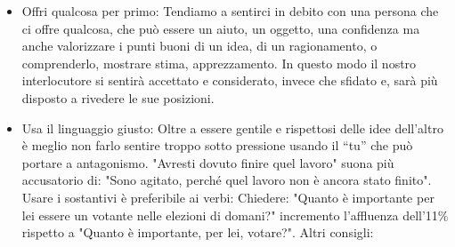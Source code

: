 \documentclass[12pt]{book} %
\begin{document}
\begin{itemize}
\item Offri qualcosa per primo: Tendiamo a sentirci in debito con una persona che ci offre qualcosa, che può essere un
aiuto, un oggetto, una confidenza ma anche valorizzare i punti buoni di un idea, di un ragionamento, o comprenderlo,
mostrare stima, apprezzamento. In questo modo il nostro interlocutore si sentirà accettato e considerato, invece che
sfidato e, sarà più disposto a rivedere le sue posizioni.
\item Usa il linguaggio giusto: Oltre a essere gentile e rispettosi delle idee dell'altro è meglio
non farlo sentire troppo sotto pressione usando il “tu” che può portare a antagonismo. "Avresti
dovuto finire quel lavoro" suona più accusatorio di: "Sono agitato, perché
quel lavoro non è ancora stato finito". Usare i sostantivi è preferibile ai verbi: Chiedere:
"Quanto è importante per lei essere un votante nelle elezioni di domani?"
incremento l'affluenza
dell'11\% rispetto a
"Quanto è importante, per lei, votare?".\newline
Altri consigli:


\end{itemize}
\end{document}
